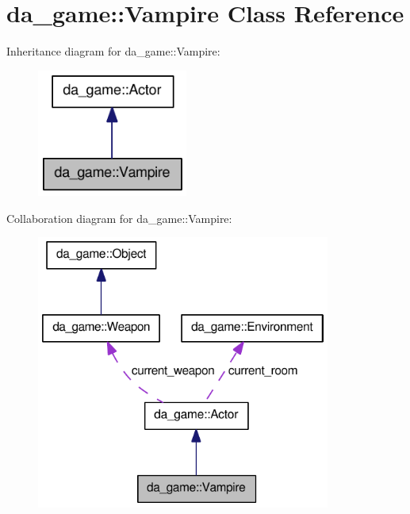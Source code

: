 \hypertarget{classda__game_1_1Vampire}{
\section{da\_\-game::Vampire Class Reference}
\label{classda__game_1_1Vampire}
}
Inheritance diagram for da\_\-game::Vampire:\nopagebreak
\begin{figure}[H]
\begin{center}
\leavevmode
\includegraphics[width=140pt]{classda__game_1_1Vampire__inherit__graph}
\end{center}
\end{figure}
Collaboration diagram for da\_\-game::Vampire:\nopagebreak
\begin{figure}[H]
\begin{center}
\leavevmode
\includegraphics[width=274pt]{classda__game_1_1Vampire__coll__graph}
\end{center}
\end{figure}
